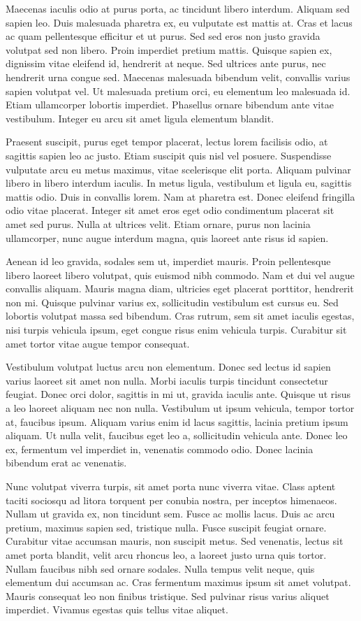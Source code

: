 \documentclass[11pt,a4paper,twocolumn]{article}
\begin{document}
Maecenas iaculis odio at purus porta, ac tincidunt libero interdum. Aliquam sed sapien leo. Duis malesuada pharetra ex, eu vulputate est mattis at. Cras et lacus ac quam pellentesque efficitur et ut purus. Sed sed eros non justo gravida volutpat sed non libero. Proin imperdiet pretium mattis. Quisque sapien ex, dignissim vitae eleifend id, hendrerit at neque. Sed ultrices ante purus, nec hendrerit urna congue sed. Maecenas malesuada bibendum velit, convallis varius sapien volutpat vel. Ut malesuada pretium orci, eu elementum leo malesuada id. Etiam ullamcorper lobortis imperdiet. Phasellus ornare bibendum ante vitae vestibulum. Integer eu arcu sit amet ligula elementum blandit.

Praesent suscipit, purus eget tempor placerat, lectus lorem facilisis odio, at sagittis sapien leo ac justo. Etiam suscipit quis nisl vel posuere. Suspendisse vulputate arcu eu metus maximus, vitae scelerisque elit porta. Aliquam pulvinar libero in libero interdum iaculis. In metus ligula, vestibulum et ligula eu, sagittis mattis odio. Duis in convallis lorem. Nam at pharetra est. Donec eleifend fringilla odio vitae placerat. Integer sit amet eros eget odio condimentum placerat sit amet sed purus. Nulla at ultrices velit. Etiam ornare, purus non lacinia ullamcorper, nunc augue interdum magna, quis laoreet ante risus id sapien.

Aenean id leo gravida, sodales sem ut, imperdiet mauris. Proin pellentesque libero laoreet libero volutpat, quis euismod nibh commodo. Nam et dui vel augue convallis aliquam. Mauris magna diam, ultricies eget placerat porttitor, hendrerit non mi. Quisque pulvinar varius ex, sollicitudin vestibulum est cursus eu. Sed lobortis volutpat massa sed bibendum. Cras rutrum, sem sit amet iaculis egestas, nisi turpis vehicula ipsum, eget congue risus enim vehicula turpis. Curabitur sit amet tortor vitae augue tempor consequat.

Vestibulum volutpat luctus arcu non elementum. Donec sed lectus id sapien varius laoreet sit amet non nulla. Morbi iaculis turpis tincidunt consectetur feugiat. Donec orci dolor, sagittis in mi ut, gravida iaculis ante. Quisque ut risus a leo laoreet aliquam nec non nulla. Vestibulum ut ipsum vehicula, tempor tortor at, faucibus ipsum. Aliquam varius enim id lacus sagittis, lacinia pretium ipsum aliquam. Ut nulla velit, faucibus eget leo a, sollicitudin vehicula ante. Donec leo ex, fermentum vel imperdiet in, venenatis commodo odio. Donec lacinia bibendum erat ac venenatis.

Nunc volutpat viverra turpis, sit amet porta nunc viverra vitae. Class aptent taciti sociosqu ad litora torquent per conubia nostra, per inceptos himenaeos. Nullam ut gravida ex, non tincidunt sem. Fusce ac mollis lacus. Duis ac arcu pretium, maximus sapien sed, tristique nulla. Fusce suscipit feugiat ornare. Curabitur vitae accumsan mauris, non suscipit metus. Sed venenatis, lectus sit amet porta blandit, velit arcu rhoncus leo, a laoreet justo urna quis tortor. Nullam faucibus nibh sed ornare sodales. Nulla tempus velit neque, quis elementum dui accumsan ac. Cras fermentum maximus ipsum sit amet volutpat. Mauris consequat leo non finibus tristique. Sed pulvinar risus varius aliquet imperdiet. Vivamus egestas quis tellus vitae aliquet. 
\end{document}

